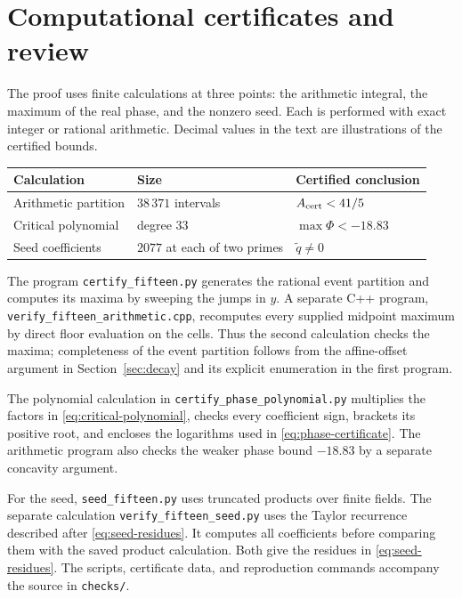 \section{Computational certificates and review}\label{sec:computations}
The proof uses finite calculations at three points: the arithmetic
integral, the maximum of the real phase, and the nonzero seed.
Each is performed with exact integer or rational arithmetic. Decimal
values in the text are illustrations of the certified bounds.

\begin{center}
\begin{tabular}{@{}lll@{}}
\toprule
Calculation & Size & Certified conclusion \\
\midrule
Arithmetic partition & $38\,371$ intervals & $A_{\rm cert}<41/5$ \\
Critical polynomial & degree $33$ & $\max\Phi<-18.83$ \\
Seed coefficients & $2077$ at each of two primes & $\widetilde q\ne0$ \\
\bottomrule
\end{tabular}
\end{center}

The program \texttt{certify\_fifteen.py} generates the rational event
partition and computes its maxima by sweeping the jumps in $y$.
A separate C++ program, \texttt{verify\_fifteen\_arithmetic.cpp},
recomputes every supplied midpoint maximum by direct floor evaluation
on the cells. Thus the second calculation checks the maxima; completeness
of the event partition follows from the affine-offset argument in
Section~\ref{sec:decay} and its explicit enumeration in the first program.

The polynomial calculation in \texttt{certify\_phase\_polynomial.py}
multiplies the factors in \eqref{eq:critical-polynomial}, checks every
coefficient sign, brackets its positive root, and encloses the logarithms
used in \eqref{eq:phase-certificate}. The arithmetic program also
checks the weaker phase bound $-18.83$ by a separate concavity argument.

For the seed, \texttt{seed\_fifteen.py} uses truncated products over
finite fields. The separate calculation
\texttt{verify\_fifteen\_seed.py} uses the Taylor recurrence described
after \eqref{eq:seed-residues}. It computes all coefficients before
comparing them with the saved product calculation. Both give the
residues in \eqref{eq:seed-residues}. The scripts, certificate data,
and reproduction commands accompany the source in \texttt{checks/}.

